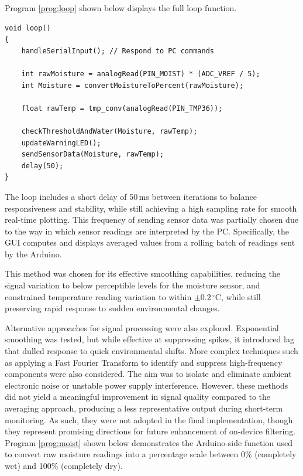 \documentclass[a4paper,11pt]{article}
\begin{document}
Program \ref{prog:loop} shown below displays the full loop function.

\begin{lstlisting}[style=cpp-style, 
    caption={Main \textit{loop} function}, label={prog:loop}]
void loop()
{
    handleSerialInput(); // Respond to PC commands

    int rawMoisture = analogRead(PIN_MOIST) * (ADC_VREF / 5);
    int Moisture = convertMoistureToPercent(rawMoisture);

    float rawTemp = tmp_conv(analogRead(PIN_TMP36));

    checkThresholdAndWater(Moisture, rawTemp);
    updateWarningLED();
    sendSensorData(Moisture, rawTemp);
    delay(50);
}
\end{lstlisting}

The loop includes a short delay of 50\,ms between iterations to balance 
responsiveness and stability, while still achieving a high sampling rate 
for smooth real-time plotting.
This frequency of sending sensor data was partially chosen due to 
the way in which sensor readings are interpreted by the PC.
Specifically, the GUI computes and displays averaged values from a rolling 
batch of readings sent by the Arduino.

This method was chosen for its effective smoothing capabilities,
reducing the signal variation to below 
perceptible levels for the moisture sensor, 
and constrained temperature reading variation to within 
$\pm 0.2\,^\circ\mathrm{C}$, while still preserving rapid 
response to sudden environmental changes.

Alternative approaches for signal processing were also explored.
Exponential smoothing was tested, but while effective at 
suppressing spikes, it introduced lag that dulled response to 
quick environmental shifts. 
More complex techniques such as applying a Fast Fourier Transform 
to identify and suppress high-frequency components were also considered. 
The aim was to isolate and eliminate ambient electronic noise 
or unstable power supply interference.
However, these methods did not yield a meaningful 
improvement in signal quality compared to the averaging approach,
producing a less representative output during short-term monitoring. 
As such, they were not adopted in the final implementation, 
though they represent promising directions for future enhancement 
of on-device filtering. 
Program \ref{prog:moist} shown below demonstrates 
the Arduino-side function used to convert raw moisture readings 
into a percentage scale between 0\% (completely wet) and 100\% (completely dry).
\end{document}
